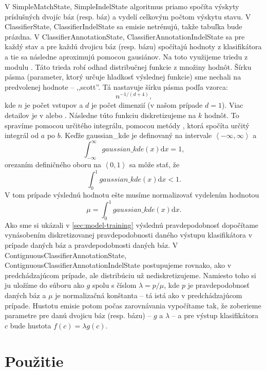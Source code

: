 V SimpleMatchState, SimpleIndelState algoritmus priamo spočíta výskyty príslušných dvojíc báz (resp. báz) a vydelí celkovým počtom výskytu stavu.
V ClassifierState, ClassifierIndelState sa emisie netrénujú, takže tabuľka bude prázdna.
V ClassifierAnnotationState, ClassifierAnnotationIndelState sa pre každý stav a pre každú dvojicu báz (resp. bázu) spočítajú hodnoty z klasifikátora a tie sa následne aproximujú pomocou gausiánov. Na toto využijeme triedu  z modulu . Táto trieda robí odhad distribučnej funkcie z množiny hodnôt. Šírku pásma (parameter, ktorý určuje hladkosť výslednej funkcie) sme nechali na predvolenej hodnote -- ,,scott''. Tá nastavuje šírku pásma podľa vzorca:
$$n^{-1/(d+4)},$$
kde $n$ je počet vstupov a $d$ je počet dimenzií (v našom prípade $d = 1$). Viac detailov je v \cite{scipydoc} alebo \cite{wiki:kde}. Následne túto funkciu diskretizujeme na $k$ hodnôt. To spravíme pomocou určitého integrálu, pomocou metódy , ktorá spočíta určitý integrál od $a$ po $b$.
Keďže gaussian\_kde je definovaný na intervale $\left<-\infty, \infty \right>$ a $$\int_{-\infty}^\infty \! gaussian\_kde(x) \mathrm{d}x = 1,$$ orezaním definičného oboru na $\left<0,1\right>$ sa môže stať, že $$\int_0^1 \! gaussian\_kde(x) \mathrm{d}x < 1.$$ V tom prípade výslednú hodnotu ešte musíme normalizovať vydelením hodnotou $$\mu = \int_0^1 \! gaussian\_kde(x) \mathrm{d}x.$$ Ako sme si ukázali v \ref{sec:model-training} výslednú pravdepodobnosť dopočítame vynásobením diskretizovanej pravdepodobnosti daného výstupu klasifikátora v prípade daných báz a pravdepodobnosti daných báz.
V ContignuousClassifierAnnotationState, ContignuousClassifierAnnotationIndelState postupujeme rovnako, ako v predchádzajúcom prípade, ale distribúciu už nediskretizujeme. Namiesto toho si ju uložíme do súboru ako $g$ spolu s číslom $\lambda = p/\mu$, kde $p$ je pravdepodobnosť daných báz a $\mu$ je normalizačná konštanta -- tá istá ako v predchádzajúcom prípade. Hustotu emisie potom počas zarovnávania vypočítame tak, že zoberieme parametre pre danú dvojicu báz (resp. bázu) -- $g$ a $\lambda$ -- a pre výstup klasifikátora $c$ bude hustota $f(c) = \lambda g(c).$

\section{Použitie}

